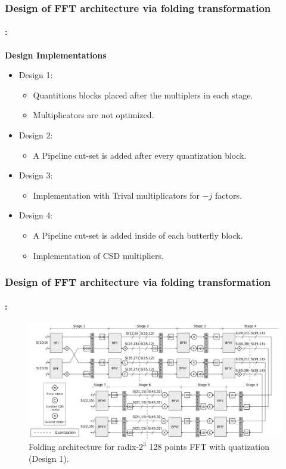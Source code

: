 \begin{frame}
	\frametitle{\textbf{Design of FFT architecture via folding transformation}}
	\framesubtitle{\secname : \subsecname}
	\begin{block}{\centering \textbf{Design Implementations}}
		\begin{itemize}\justifying\footnotesize
        	\item Design 1: 
        	\begin{itemize}\justifying\footnotesize
        		\item Quantitions blocks placed after the multiplers in each stage.
        		\item Multiplicators are not optimized.
			\end{itemize}        		 
        	\item Design 2:
			\begin{itemize}\justifying\footnotesize
				\item  A Pipeline cut-set is added after every quantization block.
			\end{itemize}				        	
        	\item Design 3:
        	\begin{itemize}\justifying\footnotesize
     			\item Implementation with Trival multiplicators for $-j$ factors. 
			\end{itemize}
        	\item Design 4:
        	\begin{itemize}\justifying\footnotesize
				\item A Pipeline cut-set is added inside of each butterfly block.				
				\item  Implementation of CSD multipliers.
			\end{itemize}
		\end{itemize}        	
	\end{block}
\end{frame}



\begin{frame}
	\frametitle{\textbf{Design of FFT architecture via folding transformation}}
	\framesubtitle{\secname : \subsecname}
	\vspace{-0.5cm}
		\begin{figure}[h!] \centering
		   	\includegraphics[width=0.95\paperwidth]{./image/folding-128-quant.pdf}
		   	\caption{ \tiny Folding architecture for radix-$2^3$  128 points FFT with quatization (Design 1).}
		\end{figure}  	
\end{frame}


